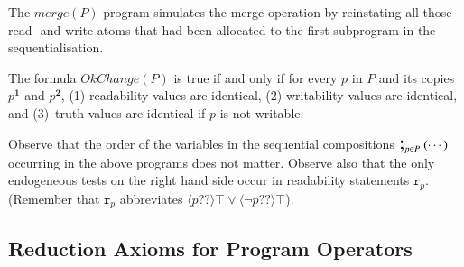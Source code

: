 \documentclass{llncs}
\newcommand{\cp}[2]{{#2}^\mathbf{#1}}
\newcommand{\modl}{\mathsf m}
\newcommand{\readable}[1]{\mathtt{r}_{#1}}
\newcommand{\testendo}{?\!\!?}			%
\newcommand{\intPgm}[1]{\llbracket #1 \rrbracket}
\newcommand{\ldia}[1]{ \big\langle #1 \big\rangle}
\newcommand{\seqseq}[1]{ \text{\Large ;}_{#1} ~ }
\begin{document}
The $\mathit{merge}(P)$ program simulates the merge operation by reinstating all those 
read- and write-atoms that had been allocated to the first subprogram in the sequentialisation. 

The formula $\mathit{OkChange}(P)$ is true if and only if for every $p$ in $P$  and its copies $\cp 1 p$ and $\cp 2 p$, 
(1) readability values are identical, 
(2) writability values are identical, and
(3)~truth values are identical if $p$ is not writable.

Observe that the order of the variables in the sequential compositions $ \seqseq{p \in P} ( \cdots ) $ occurring in the above programs does not matter. 
Observe also that the only endogeneous tests on the right hand side occur in readability statements $\readable p$. 
(Remember that $\readable p$ abbreviates $\ldia{ p \testendo} \top \lor \ldia{ \lnot p \testendo} \top $). 

%

\subsection{Reduction Axioms for Program Operators}\label{sec:redax_pgmop} 
\end{document}
